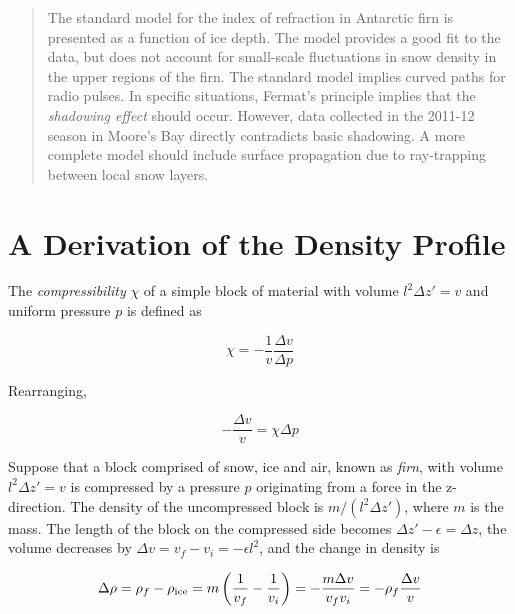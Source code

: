 \documentclass[12pt]{article}
\begin{document}
\maketitle

\begin{abstract}
The standard model for the index of refraction in Antarctic firn is presented as a function of ice depth.  The model provides a good fit to the data, but does not account for small-scale fluctuations in snow density in the upper regions of the firn.  The standard model implies curved paths for radio pulses.  In specific situations, Fermat's principle implies that the \textit{shadowing effect} should occur.  However, data collected in the 2011-12 season in Moore's Bay directly contradicts basic shadowing. A more complete model should include surface propagation due to ray-trapping between local snow layers.
\end{abstract}

\section{A Derivation of the Density Profile}

The \textit{compressibility} $\chi$ of a simple block of material with volume $l^2\Delta z' = v$ and uniform pressure $p$ is defined as

\begin{equation}
\chi = -\frac{1}{v} \frac{\Delta v}{\Delta p}
\label{eq:comp1}
\end{equation}

Rearranging,

\begin{equation}
-\frac{\Delta v}{v} = \chi \Delta p
\label{eq:comp2}
\end{equation}

Suppose that a block comprised of snow, ice and air, known as \textit{firn}, with volume $l^2\Delta z' = v$ is compressed by a pressure $p$ originating from a force in the z-direction.  The density of the uncompressed block is $m/(l^2\Delta z')$, where $m$ is the mass.  The length of the block on the compressed side becomes $\Delta z'-\epsilon = \Delta z$, the volume decreases by $\Delta v = v_{ f} - v_{ i} = -\epsilon l^2$, and the change in density is

\begin{equation}
\Delta \rho = \rho_{f} - \rho_{\rm ice} = m \left( \frac{1}{v_{f}} - \frac{1}{v_{i}} \right) = -\frac{m\Delta v}{v_{f} v_{ i}} = -\rho_{f} \frac{\Delta v}{v}
\label{eq:deltarho}
\end{equation}
\end{document}
